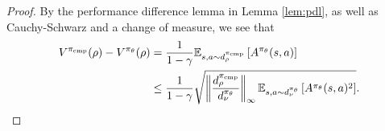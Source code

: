 \begin{proof}
    By the performance difference lemma in Lemma \ref{lem:pdl}, as well as Cauchy-Schwarz and a change of measure, we see that
    \begin{align}
        V^{\pi_{\rm cmp}}(\rho) - V^{\pi_\theta}(\rho) 
        &= \frac{1}{1-\gamma}\mathbb{E}_{s,a \sim d_\rho^{\pi_{\rm cmp}}}\left[A^{\pi_\theta}(s,a)\right] \\
        &\leq \frac{1}{1-\gamma} \sqrt{\left\lVert\frac{d_\rho^{\pi_{\rm cmp}}}{d_\nu^{\pi_\theta}}\right\rVert_\infty\mathbb{E}_{s,a \sim d_\nu^{\pi_\theta}}\left[ A^{\pi_\theta}(s,a)^2\right]}.
    \end{align}


\end{proof}
